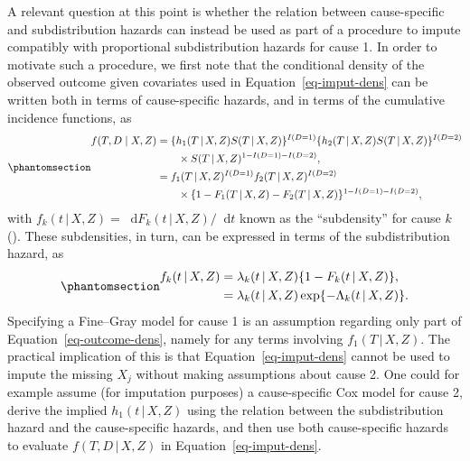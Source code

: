 \documentclass[
  letterpaper,
  paper=240mm:170mm,
  twoside=true,
  open=right,
  fontsize=10pt,
  pagesize=false,
  BCOR=15mm,
  DIV=14,
  headinclude=true,
  footinclude=false,
  headsepline=on]{scrbook}
\newcommand{\given}{\,|\,}
\newcommand\diff{\mathop{}\!\mathrm{d}}
\begin{document}
A relevant question at this point is whether the relation between
cause-specific and subdistribution hazards can instead be used as part
of a procedure to impute compatibly with proportional subdistribution
hazards for cause 1. In order to motivate such a procedure, we first
note that the conditional density of the observed outcome given
covariates used in Equation~\ref{eq-imput-dens} can be written both in
terms of cause-specific hazards, and in terms of the cumulative
incidence functions, as
\begin{equation}\phantomsection\label{eq-outcome-dens}{
\begin{aligned}
    f(T, D \mid X, Z) &= \{h_1(T \given X, Z)S(T \given X, Z)\}^{I(D = 1)}\{h_2(T \given X, Z)S(T \given X, Z)\}^{I(D = 2)}  \\
    &\qquad \times S(T \given X, Z)^{1 - I(D = 1) - I(D = 2)}, \\
    &= f_1(T \given X, Z)^{I(D = 1)}f_2(T \given X, Z)^{I(D = 2)}  \\
    &\qquad \times \{1 - F_1(T \given X,Z) - F_2(T \given X, Z)\}^{1 - I(D = 1) - I(D = 2)}, 
\end{aligned}
}\end{equation} with
\(f_k(t \given X, Z) = \diff F_k(t \given X, Z) / \diff t\) known as the
``subdensity'' for cause \(k\)
(). These
subdensities, in turn, can be expressed in terms of the subdistribution
hazard, as \begin{equation}\phantomsection\label{eq-subdenstosubdist}{
\begin{aligned}
  f_k(t \given X, Z) &= \lambda_k(t \given X, Z)\{1 - F_k(t \given X, Z)\}, \\
    &=  \lambda_k(t \given X, Z)\exp\{- \Lambda_k(t \given X, Z)\}.
\end{aligned}
}\end{equation} Specifying a Fine--Gray model for cause 1 is an
assumption regarding only part of Equation~\ref{eq-outcome-dens}, namely
for any terms involving \(f_1(T \given X, Z)\). The practical
implication of this is that Equation~\ref{eq-imput-dens} cannot be used
to impute the missing \(X_j\) without making assumptions about cause 2.
One could for example assume (for imputation purposes) a cause-specific
Cox model for cause 2, derive the implied \(h_1(t \given X, Z)\) using
the relation between the subdistribution hazard and the cause-specific
hazards, and then use both cause-specific hazards to evaluate
\(f(T, D \given X, Z)\) in Equation~\ref{eq-imput-dens}.
\end{document}
